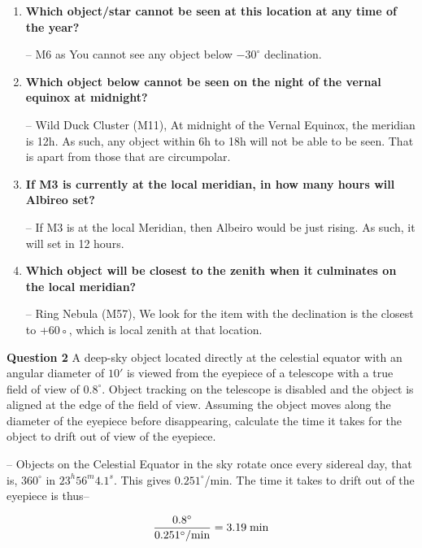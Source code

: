 \documentclass[a4paper,12pt]{extarticle}
\begin{document}
\begin{enumerate}[1.1]
	\item \textbf{Which object/star cannot be seen at this location at any time of the year?}
	\begin{sol}
		-- M6 as You cannot see any object below $-30^\circ$ declination.
	\end{sol}
	\item \textbf{Which object below cannot be seen on the night of the vernal equinox at midnight?}
	\begin{sol}
		-- Wild Duck Cluster (M11), At midnight of the Vernal Equinox, the meridian is 12h. As such, any object within 6h to 18h will not be able to be seen. That is apart from those that are circumpolar.	
	\end{sol}
	\item \textbf{If M3 is currently at the local meridian, in how many hours will Albireo set?}
	
	\begin{sol}
		-- If M3 is at the local Meridian, then Albeiro would be just rising. As such, it will set in 12 hours.
	\end{sol}
	\item \textbf{Which object will be closest to the zenith when it culminates on the local meridian?}
	
	\begin{sol}
		-- Ring Nebula (M57), We look for the item with the declination is the closest to +60◦, which is local zenith at that location.
	\end{sol}
\end{enumerate}
   
\textsf{\textbf{Question 2}}  A deep-sky object located directly at the celestial equator with an angular diameter of $10'$ is viewed from the eyepiece of a telescope with a true field of view of $0.8^\circ$. Object tracking on the telescope is disabled and the object is aligned at the edge of the field of view. Assuming the object moves along the diameter of the eyepiece before disappearing, calculate the time it takes for the object to drift out of view of the eyepiece.

\begin{sol}
-- Objects on the Celestial Equator in the sky rotate once every sidereal day, that is, $360^\circ$ in $23^h56^m4.1^s$. This gives $0.251^\circ$/min. The time it takes to drift out of the eyepiece is thus--

\[\frac{0.8^\circ}{0.251^\circ/\rm min}=3.19\; \rm min\]	
\end{sol}
\end{document}
